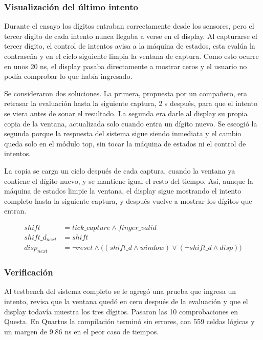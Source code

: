 \documentclass[11pt,letterpaper]{article}
\begin{document}
\subsubsection*{Visualización del último intento}

Durante el ensayo los dígitos entraban correctamente desde los sensores, pero el tercer dígito de cada intento nunca llegaba a verse en el display. Al capturarse el tercer dígito, el control de intentos avisa a la máquina de estados, esta evalúa la contraseña y en el ciclo siguiente limpia la ventana de captura. Como esto ocurre en unos 20 ns, el display pasaba directamente a mostrar ceros y el usuario no podía comprobar lo que había ingresado.

Se consideraron dos soluciones. La primera, propuesta por un compañero, era retrasar la evaluación hasta la siguiente captura, 2 s después, para que el intento se viera antes de sonar el resultado. La segunda era darle al display su propia copia de la ventana, actualizada solo cuando entra un dígito nuevo. Se escogió la segunda porque la respuesta del sistema sigue siendo inmediata y el cambio queda solo en el módulo top, sin tocar la máquina de estados ni el control de intentos.

La copia se carga un ciclo después de cada captura, cuando la ventana ya contiene el dígito nuevo, y se mantiene igual el resto del tiempo. Así, aunque la máquina de estados limpie la ventana, el display sigue mostrando el intento completo hasta la siguiente captura, y después vuelve a mostrar los dígitos que entran.

\begin{align*}
shift &= tick\_capture \land finger\_valid \\
shift\_d_{next} &= shift \\
disp_{next} &= \lnot reset \land \big((shift\_d \land window) \lor (\lnot shift\_d \land disp)\big)
\end{align*}

\subsubsection*{Verificación}

Al testbench del sistema completo se le agregó una prueba que ingresa un intento, revisa que la ventana quedó en cero después de la evaluación y que el display todavía muestra los tres dígitos. Pasaron las 10 comprobaciones en Questa. En Quartus la compilación terminó sin errores, con 559 celdas lógicas y un margen de 9.86 ns en el peor caso de tiempos.
\end{document}
